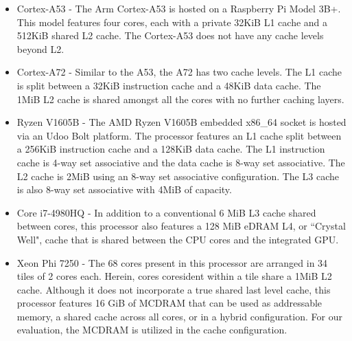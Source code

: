 \begin{itemize}
\item Cortex-A53 -  The Arm Cortex-A53 is hosted on a Raspberry Pi Model 3B+.
This model features four cores, each with a private 32KiB L1 cache and a 512KiB shared L2 cache.
The Cortex-A53 does not have any cache levels beyond L2.
\newline
\item Cortex-A72 - Similar to the A53, the A72 has two cache levels.
The L1 cache is split between a 32KiB instruction cache and a 48KiB data cache.
The 1MiB L2 cache is shared amongst all the cores with no further caching layers.
\newline
\item Ryzen V1605B - The AMD Ryzen V1605B embedded x86\_64 socket is hosted via an Udoo Bolt platform.
The processor features an L1 cache split between a 256KiB instruction cache and a 128KiB data cache.
The L1 instruction cache is 4-way set associative and the data cache is 8-way set associative.
The L2 cache is 2MiB using an 8-way set associative configuration.
The L3 cache is also 8-way set associative with 4MiB of capacity.  
\newline
\item Core i7-4980HQ - In addition to a conventional 6 MiB L3 cache shared between cores, this processor also features a 128 MiB eDRAM L4, or ``Crystal Well", cache that is shared between the CPU cores and the integrated GPU.
\newline
\item Xeon Phi 7250 - The 68 cores present in this processor are arranged in 34 tiles of 2 cores each.
Herein, cores coresident within a tile share a 1MiB L2 cache.
Although it does not incorporate a true shared last level cache, this processor features 16 GiB of MCDRAM that can be used as addressable memory, a shared cache across all cores, or in a hybrid configuration. 
For our evaluation, the MCDRAM is utilized in the cache configuration.
\end{itemize}


